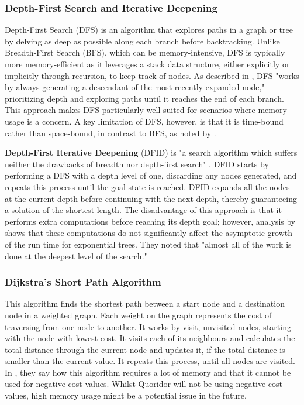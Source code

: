 \documentclass[review]{cmpreport}
\begin{document}
\subsubsection{Depth-First Search and Iterative Deepening}
Depth-First Search (DFS) is an algorithm that explores paths in a graph or tree by delving as deep as possible along each branch before backtracking. Unlike Breadth-First Search (BFS), which can be memory-intensive, DFS is typically more memory-efficient as it leverages a stack data structure, either explicitly or implicitly through recursion, to keep track of nodes. As described in \cite{korf1985depth}, DFS "works by always generating a descendant of the most recently expanded node," prioritizing depth and exploring paths until it reaches the end of each branch. This approach makes DFS particularly well-suited for scenarios where memory usage is a concern. A key limitation of DFS, however, is that it is time-bound rather than space-bound, in contrast to BFS, as noted by \cite{korf1985depth}.

\noindent \textbf{Depth-First Iterative Deepening} (DFID) is "a search algorithm which suffers neither the drawbacks of breadth nor depth-first search" \cite{korf1985depth}. DFID starts by performing a DFS with a depth level of one, discarding any nodes generated, and repeats this process until the goal state is reached. DFID expands all the nodes at the current depth before continuing with the next depth, thereby guaranteeing a solution of the shortest length. The disadvantage of this approach is that it performs extra computations before reaching its depth goal; however, analysis by \cite{korf1985depth} shows that these computations do not significantly affect the asymptotic growth of the run time for exponential trees. They noted that "almost all of the work is done at the deepest level of the search."

\subsubsection{Dijkstra's Short Path Algorithm}
This algorithm finds the shortest path between a start node and a destination node in a weighted graph. Each weight on the graph represents the cost of traversing from one node to another. It works by visit, unvisited nodes, starting with the node with lowest cost. It visits each of its neighbours and calculates the total distance through the current node and updates it, if the total distance is smaller than the current value. It repeats this process, until all nodes are visited. In \cite{lawande2022systematic}, they say how this algorithm requires a lot of memory and that it cannot be used for negative cost values. Whilst Quoridor will not be using negative cost values, high memory usage might be a potential issue in the future.
\end{document}
